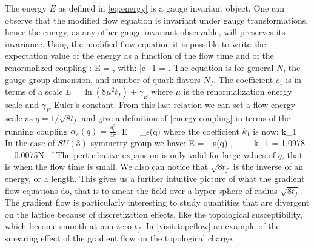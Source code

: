 The energy $E$ as defined in \cref{eq:energy} is a gauge invariant object. One can observe that the modified flow equation is invariant under gauge transformations, hence the energy, as any other gauge invariant observable, will preserves its invariance. 
Using the modified flow equation it is possible to write the expectation value of the energy as a function of the flow time and of the renormalized coupling \cite{luscher_properties_2010}:
\beq
    \langle E \rangle = ,
    \label{energy:coupling}
\eeq
with:
\beq
    \bar c_1 =   .
\eeq
The equation is for general $N$, the gauge group dimension, and number of quark flavors $N_f$. The coefficient $\bar c_1$ is in terms of a scale $L=\ln(8\mu^2t_f) + \gamma_E$ where $\mu$ is the renormalization energy scale and $\gamma_E$ Euler's constant. From this last relation we can set a flow energy scale as $q=1/\sqrt{8t_f}$ and give a definition of \cref{energy:coupling} in terms of the running coupling $\alpha_s(q) = \frac{g_0^2}{4\pi}$:
\beq
    \langle E \rangle =  \alpha_s(q) 
\eeq
where the coefficient $k_1$ is now:
\beq
   k_1 =   
\eeq
In the case of $SU(3)$ symmetry group we have:
\beq
    \langle E \rangle =  \alpha_s(q) ,~~~~~k_1 = 1.0978 + 0.0075\times N_f
    \label{energy_flow}
\eeq
The perturbative expansion is only valid for large values of $q$, that is when the flow time is small. We also can notice that $\sqrt{8t_f}$ is the inverse of an energy, or a length. This gives us a further intuitive picture of what the gradient flow equations do, that is to smear the field over a hyper-sphere of radius $\sqrt{8t_f}$. The gradient flow is particularly interesting to study quantities that are divergent on the lattice because of discretization effects, like the topological susceptibility, which become smooth at non-zero $t_f$. In \cref{visit:topcflow} an example of the smearing effect of the gradient flow on the topological charge. 
